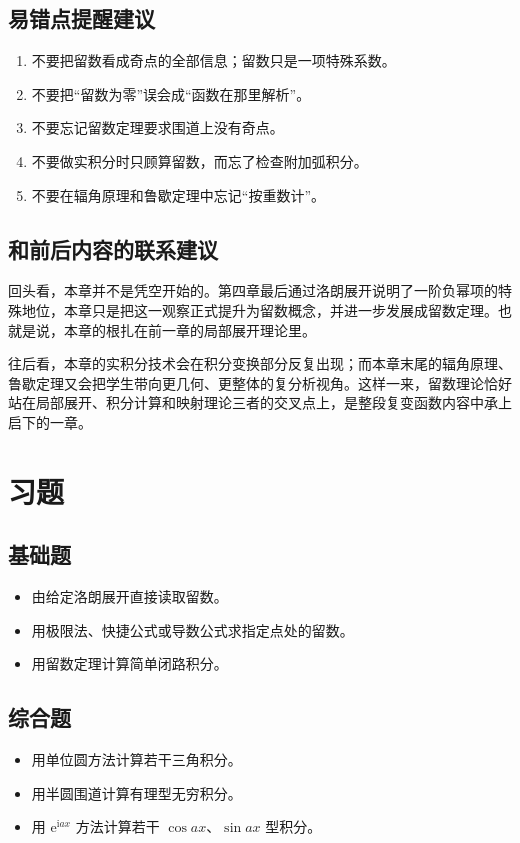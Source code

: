 \subsection*{易错点提醒建议}
\begin{jinshi}[本章最容易混淆的地方]
\begin{enumerate}
    \item 不要把留数看成奇点的全部信息；留数只是一项特殊系数。
    \item 不要把``留数为零''误会成``函数在那里解析''。
    \item 不要忘记留数定理要求围道上没有奇点。
    \item 不要做实积分时只顾算留数，而忘了检查附加弧积分。
    \item 不要在辐角原理和鲁歇定理中忘记``按重数计''。
\end{enumerate}
\end{jinshi}

\subsection*{和前后内容的联系建议}
\begin{tishi}[和前后内容的联系]
回头看，本章并不是凭空开始的。第四章最后通过洛朗展开说明了一阶负幂项的特殊地位，本章只是把这一观察正式提升为留数概念，并进一步发展成留数定理。也就是说，本章的根扎在前一章的局部展开理论里。

往后看，本章的实积分技术会在积分变换部分反复出现；而本章末尾的辐角原理、鲁歇定理又会把学生带向更几何、更整体的复分析视角。这样一来，留数理论恰好站在局部展开、积分计算和映射理论三者的交叉点上，是整段复变函数内容中承上启下的一章。
\end{tishi}

\section{习题}

\subsection*{基础题}
\begin{itemize}
    \item 由给定洛朗展开直接读取留数。
    \item 用极限法、快捷公式或导数公式求指定点处的留数。
    \item 用留数定理计算简单闭路积分。
\end{itemize}

\subsection*{综合题}
\begin{itemize}
    \item 用单位圆方法计算若干三角积分。
    \item 用半圆围道计算有理型无穷积分。
    \item 用 $\mathrm{e}^{\mathrm{i}ax}$ 方法计算若干 $\cos ax$、$\sin ax$ 型积分。
\end{itemize}

